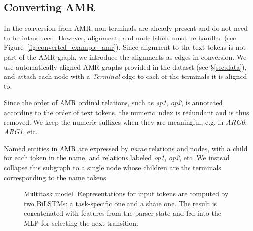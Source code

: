 \documentclass[11pt,a4paper]{article}
\begin{document}
\subsection{Converting AMR}
In the conversion from AMR, non-terminals are already present and do not need to be introduced.
However, alignments and node labels must be handled
(see Figure~\ref{fig:converted_example_amr}).
Since alignment to the text tokens is not part of the AMR graph,
we introduce the alignments as edges in conversion.
We use automatically aligned AMR graphs provided in the dataset (see \S\ref{sec:data}),
and attach each node with a \textit{Terminal} edge to each of the terminals it is aligned to.

Since the order of AMR ordinal relations, such as \textit{op1}, \textit{op2},
is annotated according to the order of text tokens,
the numeric index is redundant and is thus removed.
We keep the numeric suffixes when they are meaningful, e.g. in \textit{ARG0}, \textit{ARG1}, etc.

Named entities in AMR are expressed by \textit{name} relations and nodes, with
a child for each token in the name, and relations labeled \textit{op1}, \textit{op2}, etc.
We instead collapse this subgraph to a single node whose children are the terminals
corresponding to the name tokens.


\begin{figure}[t]
   \caption{Multitask model.
      Representations for input tokens are computed by two BiLSTMs:
      a task-specific one and a share one. The result is concatenated with
      features from the parser state and fed into the MLP for selecting the next transition.}
   \label{fig:multi_model}
\end{figure}
\end{document}
